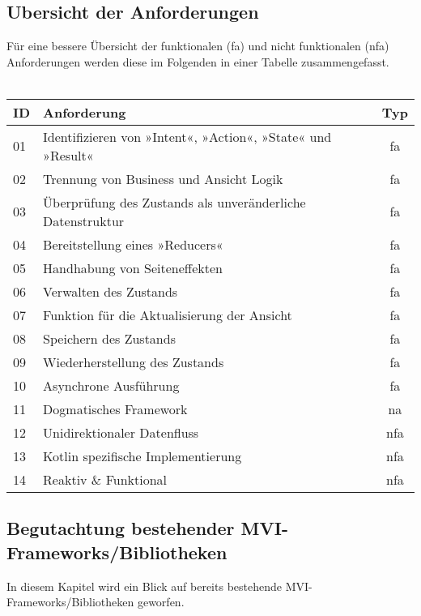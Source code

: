 \subsection{Ubersicht der Anforderungen}
Für eine bessere Übersicht der funktionalen (fa) und nicht funktionalen (nfa) Anforderungen werden diese im Folgenden in einer Tabelle zusammengefasst.
\\
\\
\begingroup
\setlength{\tabcolsep}{10pt} %
\renewcommand{\arraystretch}{1.5} %
\begin{tabular}{ | l | l | c | }
	\hline
	ID & Anforderung & Typ
	\\
	\hline
	01 & Identifizieren von »Intent«, »Action«, »State« und »Result« & fa
	\\
	\hline	
	02 & Trennung von Business und Ansicht Logik & fa
	\\
	\hline
	03 & Überprüfung des Zustands als unveränderliche Datenstruktur & fa
	\\
	\hline
	04 & Bereitstellung eines »Reducers« & fa
	\\
	\hline
	05 & Handhabung von Seiteneffekten & fa 
	\\
	\hline
	06 & Verwalten des Zustands & fa 
	\\
	\hline
	07 & Funktion für die Aktualisierung der Ansicht & fa
	\\
	\hline
	08 & Speichern des Zustands & fa
	\\
	\hline
	09 & Wiederherstellung des Zustands & fa
	\\
	\hline
	10 & Asynchrone Ausführung & fa
	\\
	\hline
	11 & Dogmatisches Framework & na
	\\
	\hline
	12 & Unidirektionaler Datenfluss & nfa
	\\
	\hline
	13 & Kotlin spezifische Implementierung & nfa
	\\
	\hline
	14 & Reaktiv \& Funktional & nfa
	\\
	\hline
\end{tabular}
\endgroup

\subsection{Begutachtung bestehender MVI-Frameworks/Bibliotheken}
In diesem Kapitel wird ein Blick auf bereits bestehende MVI-Frameworks/Bibliotheken geworfen.

